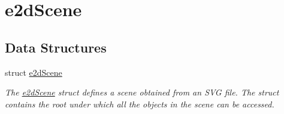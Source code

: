 \hypertarget{group__e2dScene}{\section{e2d\-Scene}
\label{group__e2dScene}
}
\subsection*{Data Structures}
\begin{DoxyCompactItemize}
\item 
struct \hyperlink{structe2dScene}{e2d\-Scene}
\begin{DoxyCompactList}\small\item\em The \hyperlink{structe2dScene}{e2d\-Scene} struct defines a scene obtained from an S\-V\-G file. The struct contains the root under which all the objects in the scene can be accessed. \end{DoxyCompactList}\end{DoxyCompactItemize}
